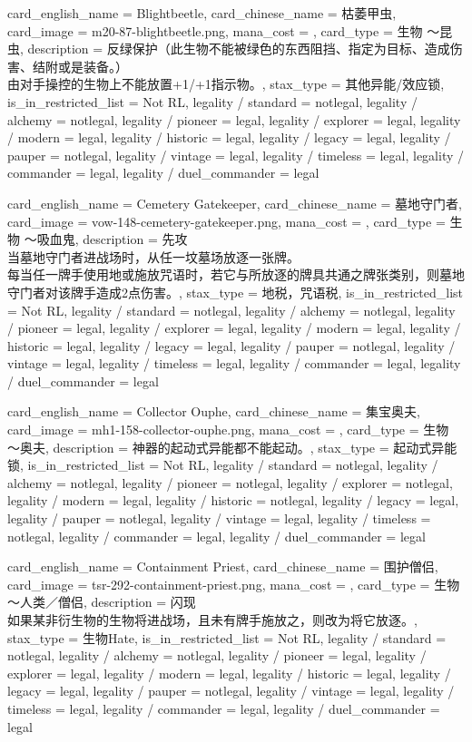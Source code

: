 \documentclass[lang = cn, color = black, 10pt]{AllThatStax}
\begin{document}
\card
{
	card_english_name = {Blightbeetle},
	card_chinese_name = {枯萎甲虫},
	card_image = m20-87-blightbeetle.png,
	mana_cost = ,
	card_type = 生物 ～昆虫,
	description = {反绿保护（此生物不能被绿色的东西阻挡、指定为目标、造成伤害、结附或是装备。）\\
		由对手操控的生物上不能放置+1/+1指示物。},
	stax_type = 其他异能/效应锁,
	is_in_restricted_list = Not RL,
	legality / standard = notlegal,
	legality / alchemy = notlegal,
	legality / pioneer = legal,
	legality / explorer = legal,
	legality / modern = legal,
	legality / historic = legal,
	legality / legacy = legal,
	legality / pauper = notlegal,
	legality / vintage = legal,
	legality / timeless = legal,
	legality / commander = legal,
	legality / duel_commander = legal
}

\card
{
	card_english_name = {Cemetery Gatekeeper},
	card_chinese_name = {墓地守门者},
	card_image = vow-148-cemetery-gatekeeper.png,
	mana_cost = ,
	card_type = 生物 ～吸血鬼,
	description = {先攻\\
		当墓地守门者进战场时，从任一坟墓场放逐一张牌。\\
		每当任一牌手使用地或施放咒语时，若它与所放逐的牌具共通之牌张类别，则墓地守门者对该牌手造成2点伤害。},
	stax_type = 地税，咒语税,
	is_in_restricted_list = Not RL,
	legality / standard = notlegal,
	legality / alchemy = notlegal,
	legality / pioneer = legal,
	legality / explorer = legal,
	legality / modern = legal,
	legality / historic = legal,
	legality / legacy = legal,
	legality / pauper = notlegal,
	legality / vintage = legal,
	legality / timeless = legal,
	legality / commander = legal,
	legality / duel_commander = legal
}

\card
{
	card_english_name = {Collector Ouphe},
	card_chinese_name = {集宝奥夫},
	card_image = mh1-158-collector-ouphe.png,
	mana_cost = ,
	card_type = 生物 ～奥夫,
	description = {神器的起动式异能都不能起动。},
	stax_type = 起动式异能锁,
	is_in_restricted_list = Not RL,
	legality / standard = notlegal,
	legality / alchemy = notlegal,
	legality / pioneer = notlegal,
	legality / explorer = notlegal,
	legality / modern = legal,
	legality / historic = notlegal,
	legality / legacy = legal,
	legality / pauper = notlegal,
	legality / vintage = legal,
	legality / timeless = notlegal,
	legality / commander = legal,
	legality / duel_commander = legal
}

\card
{
	card_english_name = {Containment Priest},
	card_chinese_name = {围护僧侣},
	card_image = tsr-292-containment-priest.png,
	mana_cost = ,
	card_type = 生物 ～人类／僧侣,
	description = {闪现\\
		如果某非衍生物的生物将进战场，且未有牌手施放之，则改为将它放逐。},
	stax_type = 生物Hate,
	is_in_restricted_list = Not RL,
	legality / standard = notlegal,
	legality / alchemy = notlegal,
	legality / pioneer = legal,
	legality / explorer = legal,
	legality / modern = legal,
	legality / historic = legal,
	legality / legacy = legal,
	legality / pauper = notlegal,
	legality / vintage = legal,
	legality / timeless = legal,
	legality / commander = legal,
	legality / duel_commander = legal
}
\end{document}
